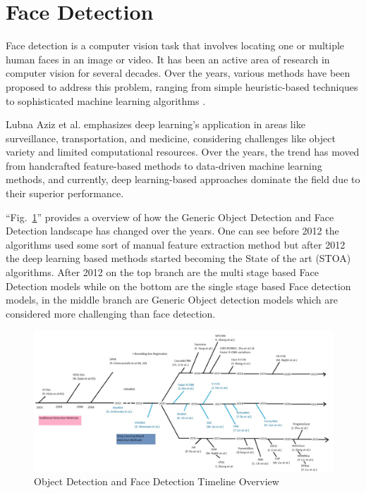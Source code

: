\section{Face Detection} \label{section:fd}
Face detection is a computer vision task that involves locating one or multiple human faces in an image or video. It has been an active area of research in computer vision for several decades. Over the years, various methods have been proposed to address this problem, ranging from simple heuristic-based techniques to sophisticated machine learning algorithms \cite{feng_detect_2022}.

Lubna Aziz et al. \cite{aziz_exploring_2020} emphasizes deep learning's application in areas like surveillance, transportation, and medicine, considering challenges like object variety and limited computational resources. Over the years, the trend has moved from handcrafted feature-based methods to data-driven machine learning methods, and currently, deep learning-based approaches dominate the field due to their superior performance.

``Fig.~\ref{od-timeline}'' provides a overview of how the Generic Object Detection and Face Detection landscape has changed over the years. One can see before 2012 the algorithms used some sort of manual feature extraction method but after 2012 the deep learning based methods started becoming the State of the art (STOA) algorithms. After 2012 on the top branch are the multi stage based Face Detection models while on the bottom are the single stage based Face detection models, in the middle branch are Generic Object detection models which are considered more challenging than face detection.

\begin{figure}[htbp]
\centerline{\includegraphics[width=\columnwidth]{components/images/od-timeline.jpg}}
\caption{Object Detection and Face Detection Timeline Overview}
\label{od-timeline}
\end{figure}

